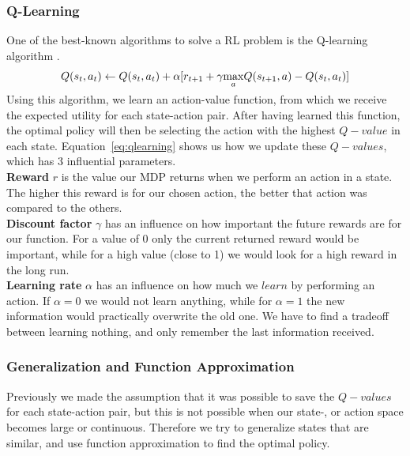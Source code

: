 \documentclass[a4paper,12pt]{article}
\begin{document}
\subsubsection{Q-Learning}
One of the best-known algorithms to solve a RL problem is the Q-learning algorithm \cite{sutton1998rl}.
\begin{equation}
Q(s_{t}, a_{t}) \gets Q(s_{t}, a_{t}) + \alpha[r_{t+1} + \gamma\smash{\displaystyle\max_{a}} Q(s_{t+1}, a) - Q(s_{t}, a_{t})]
\label{eq:qlearning}
\end{equation}
Using this algorithm, we learn an action-value function, from which we receive the expected utility for each state-action pair. After having learned this function, the optimal policy will then be selecting the action with the highest $Q-value$ in each state. Equation~\ref{eq:qlearning} shows us how we update these $Q-values$, which has 3 influential parameters.\\
\textbf{Reward} $r$ is the value our MDP returns when we perform an action in a state. The higher this reward is for our chosen action, the better that action was compared to the others.\\
\textbf{Discount factor} $\gamma$ has an influence on how important the future rewards are for our function. For a value of 0 only the current returned reward would be important, while for a high value (close to 1) we would look for a high reward in the long run.\\
\textbf{Learning rate} $\alpha$ has an influence on how much we $learn$ by performing an action. If $\alpha=0$ we would not learn anything, while for $\alpha=1$ the new information would practically overwrite the old one. We have to find a tradeoff between learning nothing, and only remember the last information received.

\subsubsection{Generalization and Function Approximation}
Previously we made the assumption that it was possible to save the $Q-values$ for each state-action pair, but this is not possible when our state-, or action space becomes large or continuous. Therefore we try to generalize states that are similar, and use function approximation to find the optimal policy. 
\end{document}
